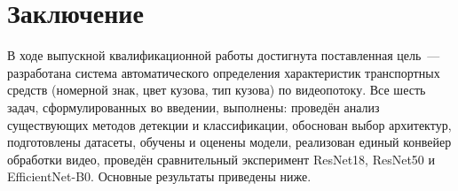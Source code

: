 \documentclass[10pt,a4paper]{report}
\numberwithin{equation}{chapter}
\numberwithin{figure}{chapter}
\numberwithin{table}{chapter}
\begin{document}
\chapter*{Заключение}

В ходе выпускной квалификационной работы достигнута поставленная цель~---
разработана система автоматического определения характеристик транспортных
средств (номерной знак, цвет кузова, тип кузова) по видеопотоку. Все шесть
задач, сформулированных во введении, выполнены:
проведён анализ существующих методов детекции и классификации, обоснован
выбор архитектур, подготовлены датасеты, обучены и оценены модели,
реализован единый конвейер обработки видео, проведён сравнительный
эксперимент ResNet18, ResNet50 и EfficientNet-B0. Основные результаты приведены ниже.
\end{document}
